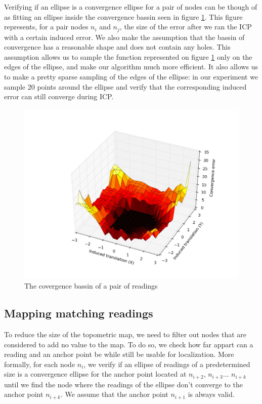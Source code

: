 \documentclass[letterpaper,10 pt,conference]{ieeeconf}
\begin{document}
Verifying if an ellipse is a convergence ellipse for a pair of nodes can be though of as fitting an
ellipse inside the convergence bassin seen in figure \ref{convergence_bassin}. This figure
represents, for a pair nodes $n_i$ and $n_j$, the size of the error after we ran the ICP with a
certain induced error. We also make the assumption that the bassin of convergence has a reasonable
shape and does not contain any holes. This assumption allows us to sample the function represented
on figure \ref{convergence_bassin} only on the edges of the ellipse, and make our algorithm much
more efficient. It also allows us to make a pretty sparse sampling of the edges of the ellipse: in
our experiment we sample 20 points around the ellipse and verify that the corresponding induced
error can still converge during ICP.

\begin{figure}[thpb]
  \centering
  \includegraphics[scale=0.4]{convergence_bassin}
  \caption{The covergence bassin of a pair of readings}
  \label{convergence_bassin}
\end{figure}

\subsection{Mapping matching readings}
\label{matching-readings}
To reduce the size of the topometric map, we need to filter out nodes that are considered to add no
value to the map. To do so, we check how far appart can a reading and an anchor point be while still
be usable for localization. More formally, for each node $n_i$, we verify if an ellipse of readings
of a predetermined size is a convergence ellipse for the anchor point located at $n_{i+2}$,
$n_{i+3}$... $n_{i+k}$ until we find the node where the readings of the ellipse don't converge to
the anchor point $n_{i+k}$. We assume that the anchor point $n_{i+1}$ is always valid.
\end{document}
